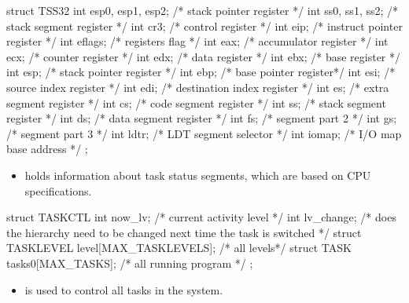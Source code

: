 \documentclass{swfcthesis}
\begin{document}
\begin{codeblock}[1]
\begin{ccode}
struct TSS32
{ 
  int esp0, esp1, esp2; /* stack pointer register */
  int ss0, ss1, ss2;    /* stack segment register */
  int cr3;    /* control register */
  int eip;    /* instruct pointer register */
  int eflags; /* registers flag */
  int eax;    /* accumulator register */
  int ecx;    /* counter register */
  int edx;    /* data register */
  int ebx;    /* base register */
  int esp;    /* stack pointer register */
  int ebp;    /* base pointer register*/
  int esi;    /* source index register */
  int edi;    /* destination index register */
  int es;     /* extra segment register */
  int cs;     /* code segment register */
  int ss;     /* stack segment register */
  int ds;     /* data segment register */
  int fs;     /* segment part 2 */
  int gs;     /* segment part 3 */
  int ldtr;   /* LDT segment selector */
  int iomap;  /* I/O map base address */
};
\end{ccode}
\end{codeblock}
\begin{itemize}
\item holds information about task status segments, which are based on CPU
  specifications\cite[Sec.6.2.1]{intel_3a}.
\end{itemize}

\begin{codeblock}[1]
\begin{ccode}
struct TASKCTL
{ 
  int now_lv;    /* current activity level */
  int lv_change; /* does the hierarchy need to be changed next time the task is switched */
  struct TASKLEVEL level[MAX_TASKLEVELS]; /* all levels*/
  struct TASK tasks0[MAX_TASKS];          /* all running program */
};
\end{ccode}
\end{codeblock}
\begin{itemize}
\item is used to control all tasks in the system.
\end{itemize}
\end{document}
